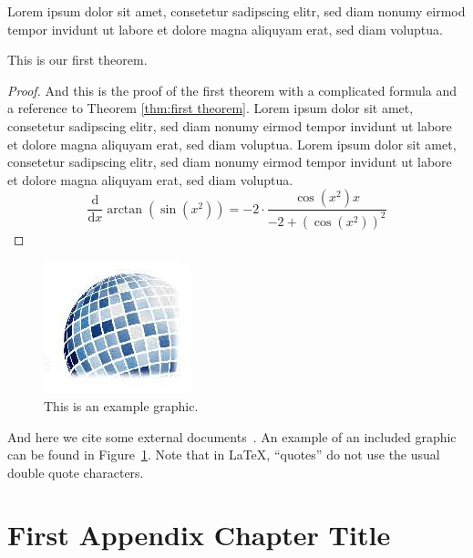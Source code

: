 \documentclass[a4paper, oneside]{discothesis}
\begin{document}
Lorem ipsum dolor sit amet, consetetur sadipscing elitr, sed diam nonumy eirmod tempor invidunt ut labore et dolore magna aliquyam erat, sed diam voluptua.

\begin{theorem} \label{thm:first theorem}
	This is our first theorem.
\end{theorem}

\begin{proof}
	And this is the proof of the first theorem with a complicated formula and a reference to Theorem \ref{thm:first theorem}. Lorem ipsum dolor sit amet, consetetur sadipscing elitr, sed diam nonumy eirmod tempor invidunt ut labore et dolore magna aliquyam erat, sed diam voluptua. Lorem ipsum dolor sit amet, consetetur sadipscing elitr, sed diam nonumy eirmod tempor invidunt ut labore et dolore magna aliquyam erat, sed diam voluptua.
	\begin{equation}
		{\frac {\mathrm d}{\mathrm dx}}\arctan(\sin({x}^{2}))=-2 \cdot {\frac {\cos({x}^{2})x}{-2+\left (\cos({x}^{2})\right )^{2}}}
	\end{equation}	
\end{proof}

\begin{figure}
    \centering
    \includegraphics[width=0.2\columnwidth]{figures/disco_logo_faded}
    \caption{This is an example graphic.}
    \label{fig:example_figure}
\end{figure}

And here we cite some external documents~\cite{TestReference, TestReference2}.
An example of an included graphic can be found in Figure~\ref{fig:example_figure}.
Note that in \LaTeX, ``quotes'' do not use the usual double quote characters.




\appendix
\chapter{First Appendix Chapter Title}
\end{document}
